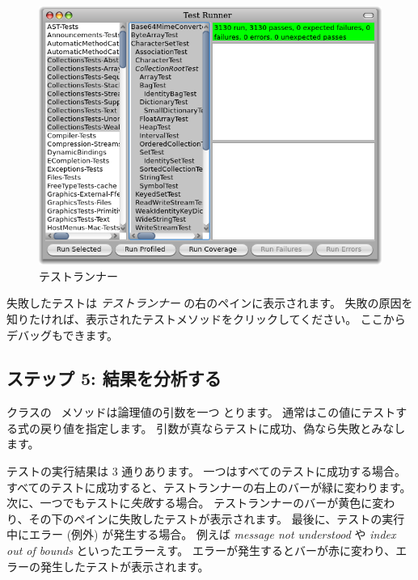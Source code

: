 \documentclass[a4paper,10pt,twoside]{book}
\begin{document}
\begin{figure}[tbh]
  \begin{center}
	\includegraphics[width=\linewidth]{test-runner}
	\caption{\pharo \sunit テストランナー}
  \end{center}
\end{figure}



失敗したテストは \emph{テストランナー} の右のペインに表示されます。
失敗の原因を知りたければ、表示されたテストメソッドをクリックしてください。
ここからデバッグもできます。

\subsection{ステップ 5: 結果を分析する}

 クラスの \ メソッドは論理値の引数を一つ
とります。
通常はこの値にテストする式の戻り値を指定します。
引数が真ならテストに成功、偽なら失敗とみなします。


テストの実行結果は 3 通りあります。
一つはすべてのテストに成功する場合。
すべてのテストに成功すると、{テストランナー}の右上のバーが緑に変わります。
次に、一つでもテストに\emph{失敗}する場合。
{テストランナー}のバーが黄色に変わり、その下のペインに失敗したテストが表示されます。
最後に、テストの実行中にエラー (例外) が発生する場合。
例えば \emph{message not understood} や \emph{index out of bounds} といったエラーえす。
エラーが発生するとバーが赤に変わり、エラーの発生したテストが表示されます。
\end{document}

